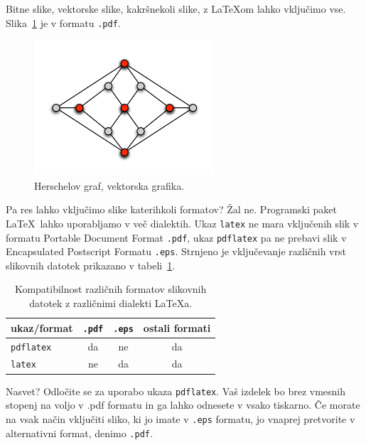 \documentclass[a4paper, 12pt]{book}
\begin{document}
Bitne slike, vektorske slike, kakršnekoli slike, z \LaTeX{}om lahko vključimo vse.
Slika~\ref{pic1} je v formatu {\tt .pdf}.
\begin{figure}[h]
\begin{center}
\includegraphics[width=0.6\textwidth]{pic1.pdf}
\end{center}
\caption{Herschelov graf, vektorska grafika.}
\label{pic1}
\end{figure}
Pa res lahko vključimo slike katerihkoli formatov? 
Žal ne. 
Programski paket \LaTeX\ lahko uporabljamo v več dialektih. 
Ukaz {\tt latex} ne mara vključenih slik v formatu Portable Document Format {\tt .pdf}, ukaz {\tt pdflatex} pa ne prebavi slik v Encapsulated Postscript Formatu {\tt .eps}.
Strnjeno je vključevanje različnih vrst slikovnih datotek prikazano v tabeli~\ref{tbl:1}.

\begin{table}
\begin{center}
\begin{tabular}{l|ccc}
ukaz/format & {\tt .pdf} & {\tt .eps} & ostali formati \\ \hline
{\tt pdflatex} & da & ne & da \\
{\tt latex}   & ne & da  & da
\end{tabular}
\end{center}
\caption{Kompatibilnost različnih formatov slikovnih datotek z različnimi dialekti  \LaTeX a.}
\label{tbl:1}
\end{table}

Nasvet? 
Odločite se za uporabo ukaza {\tt pdflatex}. Vaš izdelek bo brez vmesnih stopenj na voljo v {.pdf} formatu in ga lahko odnesete v vsako tiskarno. 
Če morate na vsak način vključiti sliko, ki jo imate v {\tt .eps} formatu, jo vnaprej pretvorite v alternativni format, denimo {\tt .pdf}.
\end{document}
